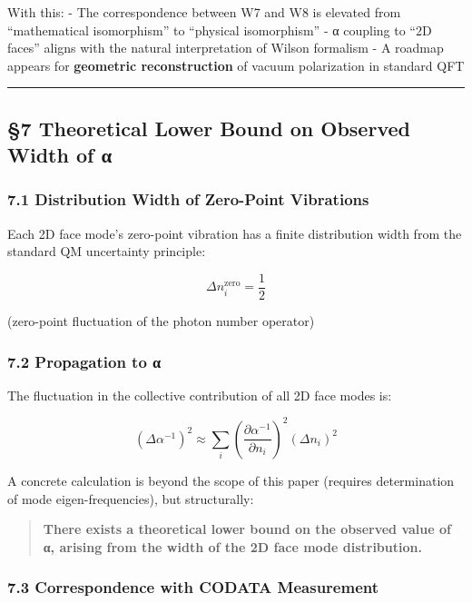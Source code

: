 \documentclass[
  11pt]{article}
\begin{document}
With this: - The correspondence between W7 and W8 is elevated from
``mathematical isomorphism'' to ``physical isomorphism'' - α coupling to
``2D faces'' aligns with the natural interpretation of Wilson formalism
- A roadmap appears for \textbf{geometric reconstruction} of vacuum
polarization in standard QFT

\begin{center}\rule{0.5\linewidth}{0.5pt}\end{center}

\subsection{§7 Theoretical Lower Bound on Observed Width of
α}\label{theoretical-lower-bound-on-observed-width-of-ux3b1}

\subsubsection{7.1 Distribution Width of Zero-Point
Vibrations}\label{distribution-width-of-zero-point-vibrations}

Each 2D face mode's zero-point vibration has a finite distribution width
from the standard QM uncertainty principle:

\[\Delta n_i^{\text{zero}} = \frac{1}{2}\]

(zero-point fluctuation of the photon number operator)

\subsubsection{7.2 Propagation to α}\label{propagation-to-ux3b1}

The fluctuation in the collective contribution of all 2D face modes is:

\[(\Delta \alpha^{-1})^2 \approx \sum_i \left(\frac{\partial \alpha^{-1}}{\partial n_i}\right)^2 (\Delta n_i)^2\]

A concrete calculation is beyond the scope of this paper (requires
determination of mode eigen-frequencies), but structurally:

\begin{quote}
\textbf{There exists a theoretical lower bound on the observed value of
α, arising from the width of the 2D face mode distribution.}
\end{quote}

\subsubsection{7.3 Correspondence with CODATA
Measurement}\label{correspondence-with-codata-measurement}
\end{document}
